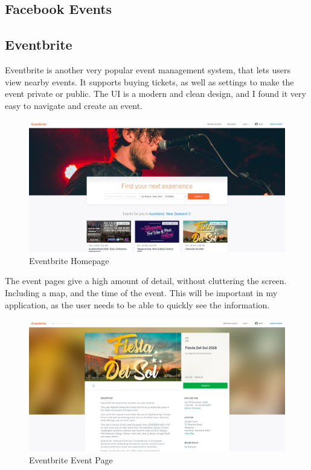 \documentclass[a4paper,oneside,12pt,draft]{report}
\begin{document}
	\subsection{Facebook Events}

	\subsection{Eventbrite}
	Eventbrite is another very popular event management system, that lets users view nearby events.
	It supports buying tickets, as well as settings to make the event private or public. The UI is a modern and clean design, and I found it very easy to navigate and create an event.

	\begin{figure}[H]
		\caption{Eventbrite Homepage}
		\includegraphics[width=\linewidth]{static/eventbrite-home.png}
	\end{figure}

	The event pages give a high amount of detail, without cluttering the screen. Including a map, and the time of the event. This will be important in my application, as the user needs to be able to quickly see the information.

	\begin{figure}[H]
		\caption{Eventbrite Event Page}
		\includegraphics[width=\linewidth]{static/eventbrite-event.png}
	\end{figure}
\end{document}
